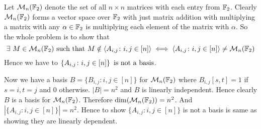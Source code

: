 \documentclass[a4paper, 11pt]{article}
\begin{document}
{Let $\mathcal{M}_n(\mathbb{F}_2)$ denote the set of all $n\times n$ matrices with each entry from $\mathbb{F}_2$. Clearly $\mathcal{M}_n(\mathbb{F}_2)$ forms a vector space over $\mathbb{F}_2$ with just matrix addition with multiplying a matrix with any $\alpha\in\mathbb{F}_2$ is multiplying each element of the matrix with $\alpha$. So the whole problem is to show that $$\exs\ M\in\mcM_n(\bbF_2)\text{ such that }M\notin \lt\la A_{i,j}\colon i,j\in[n]\rt\ra\iff \lt\la A_{i,j}\colon i,j\in[n]\rt\ra\neq \mcM_n(\bbF_2)$$Hence we have to $\left\{ A_{i,j}\colon i,j\in[n]\right\}\text{ is not a basis}$. 

Now we have a basis $B=\{B_{i,j}\colon i,j\in[n]\}$ for $\mathcal{M}_n(\mathbb{F}_2)$ where $B_{i,j}[s,t]=1$ if $s=i,t=j$ and $0$ otherwise. $|B|=n^2$ and $B$ is linearly independent. Hence clearly $B$ is a basis for $\mathcal{M}_n(\mathbb{F}_2)$. Therefore $\dim(\mathcal{M}_n(\mathbb{F}_2))=n^2$. And $|\{A_{i,j}\colon i,j\in[n]\}|=n^2$. Hence to show $\{A_{i,j}\colon i,j\in[n]\}$ is not a basis is same as showing they are linearly dependent. 

}
\end{document}
